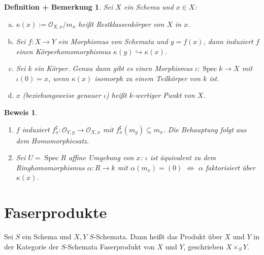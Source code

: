 \documentclass[a4paper,oneside]{scrbook}
\theoremstyle{break}
\newtheorem{DefBem}[Def]{Definition + Bemerkung}
\theoremstyle{nonumberbreak}
\theoremstyle{nonumberplain}
\newtheorem{Bew}{Beweis}
\theoremstyle{break}
\newcommand{\Spec}{%
	\ensuremath{\operatorname{Spec}}%
}
\begin{document}
\begin{DefBem}
\label{defbem:4.4}
Sei $X$ ein Schema und $x \in X$:
\begin{enumerate}[(a)]
	\item $\kappa(x):=\mathcal{O}_{X,x}/m_x$ heißt Restklassenkörper von $X$ in $x$.
	\item Sei $f: X \rightarrow Y$ ein Morphismus von Schemata und $y=f(x)$, dann induziert $f$ einen Körperhomomorphismus $\kappa(y) \hookrightarrow \kappa(x)$.
	\item Sei $k$ ein Körper. Genau dann gibt es einen Morphismus $\iota: \Spec k \rightarrow X$ mit $\iota(0) = x$, wenn $\kappa(x)$ isomorph zu einem Teilkörper von $k$ ist.
	\item $x$ (beziehungsweise genauer $\iota$) heißt $k$-wertiger Punkt von $X$.
\end{enumerate}
\end{DefBem}
\begin{Bew}
	\begin{enumerate}
		\item[(b)] $f$ induziert $f^\sharp_x: \mathcal{O}_{Y,y} \rightarrow \mathcal{O}_{X,x}$ mit $f^\sharp_x(m_y) \subseteq m_x$. Die Behauptung folgt aus dem Homomorphiesatz.
		\item[(c)] Sei $U = \Spec R$ affine Umgebung von $x$: $\iota$ ist äquivalent zu dem Ringhomomorphismus $\alpha: R \rightarrow k $ mit $\alpha(m_x)=(0)$ $\Leftrightarrow$ $\alpha$ faktorisiert über $\kappa(x)$.
	\end{enumerate}
\end{Bew}

\section{Faserprodukte}

Sei $S$ ein Schema und $X,Y$ $S$-Schemata. Dann heißt das Produkt über $X$ und $Y$ in der Kategorie der $S$-Schemata Faserprodukt von $X$ und $Y$, geschrieben $X \times_S Y$.
\end{document}
